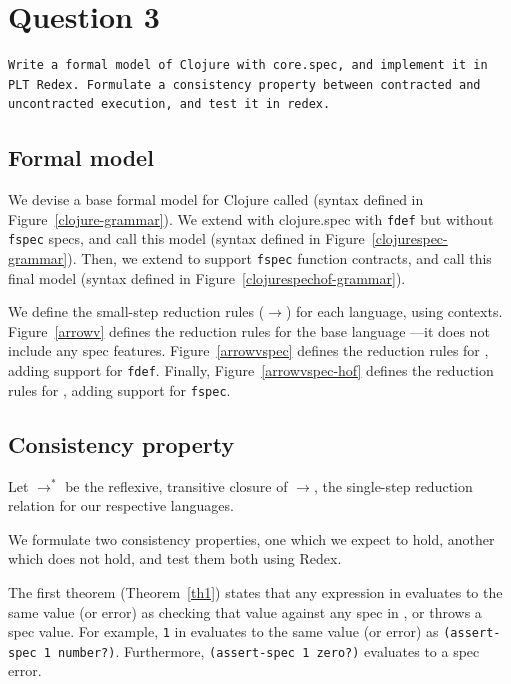 \section{Question 3}

\begin{verbatim}
Write a formal model of Clojure with core.spec, and implement it in
PLT Redex. Formulate a consistency property between contracted and
uncontracted execution, and test it in redex.
\end{verbatim}

\subsection{Formal model}

%

We devise a base formal model for Clojure called \lambdac{}
(syntax defined in Figure~\ref{clojure-grammar}).
We extend \lambdac{} with clojure.spec with \texttt{fdef} but without 
\texttt{fspec} specs, and call
this model \lambdacs{}
(syntax defined in Figure~\ref{clojurespec-grammar}).
Then, we extend \lambdacs{} to support
\texttt{fspec} function contracts, and call this final model \lambdacsf{}
(syntax defined in Figure~\ref{clojurespechof-grammar}).

We define the small-step reduction rules ($\rightarrow$) for each language, using contexts.
Figure~\ref{arrowv} defines the reduction rules for 
the base language \lambdac{}---it does not include any spec features.
Figure~\ref{arrowvspec} defines the reduction rules for 
\lambdacs{}, adding support for \texttt{fdef}.
Finally, Figure~\ref{arrowvspec-hof} defines the reduction rules for 
\lambdacsf{}, adding support for \texttt{fspec}.

\subsection{Consistency property}

Let $\rightarrow^{*}$ be the reflexive, transitive closure of $\rightarrow$,
the single-step reduction relation for our respective languages.

We formulate two consistency properties, one which we expect to hold, another
which does not hold, and test them both using Redex.

The first theorem (Theorem~\ref{th1}) states that any expression in \lambdac{}
evaluates to the same value (or error) as checking that value against
any spec in \lambdacs{}, or throws a spec value.
For example, \texttt{1} in \lambdac{} evaluates to the same value (or error)
as \texttt{(assert-spec 1 number?)}. Furthermore, \texttt{(assert-spec 1 zero?)} 
evaluates to a spec error.

